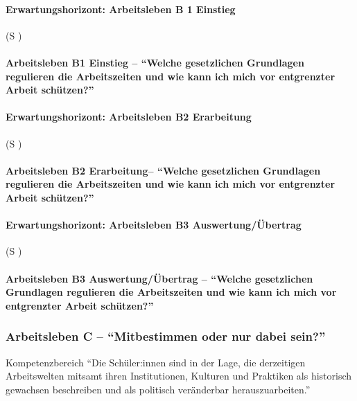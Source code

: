 \paragraph{Erwartungshorizont: Arbeitsleben B 1 Einstieg} (\gls{S} \pageref{ARBEITSLEBEN-B1})

\paragraph{Arbeitsleben B1 Einstieg -- \enquote{Welche gesetzlichen Grundlagen regulieren die Arbeitszeiten und wie kann ich mich vor entgrenzter Arbeit schützen?}}



\paragraph{Erwartungshorizont: Arbeitsleben B2 Erarbeitung} (\gls{S} \pageref{ARBEITSLEBEN-B2})

\paragraph{Arbeitsleben B2 Erarbeitung-- \enquote{Welche gesetzlichen Grundlagen regulieren die Arbeitszeiten und wie kann ich mich vor entgrenzter Arbeit schützen?}}



\paragraph{Erwartungshorizont: Arbeitsleben B3 Auswertung/Übertrag} (\gls{S} \pageref{ARBEITSLEBEN-B3})

\paragraph{Arbeitsleben B3 Auswertung/Übertrag -- \enquote{Welche gesetzlichen Grundlagen regulieren die Arbeitszeiten und wie kann ich mich vor entgrenzter Arbeit schützen?}}





\subsubsection{Arbeitsleben C -- \enquote{Mitbestimmen oder nur dabei sein?}}
Kompetenzbereich
\enquote{Die Schüler:innen sind in der Lage, die derzeitigen Arbeitswelten mitsamt ihren Institutionen, Kulturen und Praktiken als historisch gewachsen beschreiben und als politisch veränderbar herauszuarbeiten.}


